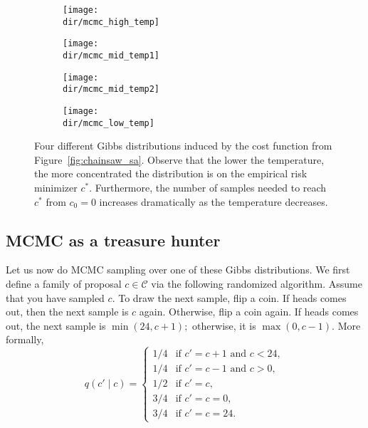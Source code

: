 \begin{figure}
    \centering
    \begin{subfigure}[b]{0.6\textwidth}
        \texttt{[image: \\dir/mcmc\_high\_temp]}
        \caption{}
        \label{fig:mcmc_high_temp}
    \end{subfigure}

    \begin{subfigure}[b]{0.6\textwidth}
        \texttt{[image: \\dir/mcmc\_mid\_temp1]}
        \caption{}
        \label{fig:mcmc_mid1_temp}
    \end{subfigure}
    
    \begin{subfigure}[b]{0.6\textwidth}
        \texttt{[image: \\dir/mcmc\_mid\_temp2]}
        \caption{}
        \label{fig:mcmc_mid2_temp}
    \end{subfigure}

    \begin{subfigure}[b]{0.6\textwidth}
        \texttt{[image: \\dir/mcmc\_low\_temp]}
        \caption{}
        \label{fig:mcmc_low_temp}
    \end{subfigure}
    \caption{Four different Gibbs distributions induced by the cost function
from Figure~\ref{fig:chainsaw_sa}. Observe that the lower the temperature, the more
concentrated the distribution is on the empirical risk minimizer $c^*$. Furthermore,
the number of samples needed to reach $c^*$ from $c_0 = 0$ increases
dramatically as the temperature decreases.}
\end{figure}

\subsection{MCMC as a treasure hunter}

Let us now do MCMC sampling over one of these Gibbs distributions.
We first define a family of proposal $c \in \mathcal{C}$ via
the following randomized algorithm. Assume that you have sampled $c$. To
draw the next sample, flip a coin. If heads comes out, then the next sample
is $c$ again. Otherwise, flip a coin again. If heads comes out, the next sample is $\min(24, c + 1);$ otherwise, it is $\max(0, c - 1)$. More formally,
%
\begin{equation}
q(c' \mid c) =
\begin{cases}
1/4 & \text{if $c' = c + 1$ and $c < 24$},\\
1/4 & \text{if $c' = c - 1$ and $c > 0$},\\
1/2 & \text{if $c' = c$},\\
3/4 & \text{if $c' = c = 0$},\\
3/4 & \text{if $c' = c = 24$}.
\end{cases}
\end{equation}

